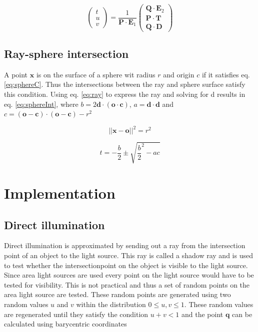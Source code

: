 \documentclass[twocolumn]{article}
\begin{document}
\begin{equation}
\label{eq:triInt}
\begin{pmatrix}
	t \\
  	u \\
  	v 
\end{pmatrix}
= \frac{1}{\mathbf{P} \cdot \mathbf{E}_1}
\begin{pmatrix}
	  	\mathbf{Q} \cdot \mathbf{E}_2 \\
  		\mathbf{P} \cdot \mathbf{T} \\
  		\mathbf{Q} \cdot \mathbf{D}
\end{pmatrix}
\end{equation}

\subsection{Ray-sphere intersection}
A point $\mathbf{x}$ is on the surface of a sphere wit radius $r$ and origin $c$ if it satisfies eq. \ref{eq:sphereC}. Thus the intersections between the ray and sphere surface satisfy this condition. Using eq. \ref{eq:ray} to express the ray and solving for d results in eq. \ref{eq:sphereInt}, where $b = 2\mathbf{d} \cdot (\mathbf{o} \cdot \mathbf{c})$, $a = \mathbf{d} \cdot \mathbf{d}$ and $c = (\mathbf{o} - \mathbf{c}) \cdot (\mathbf{o} - \mathbf{c}) - r^2$

\begin{equation}
	\label{eq:sphereC}
	||\mathbf{x} - \mathbf{o}||^2 = r^2
\end{equation}

\begin{equation}
	\label{eq:sphereInt}
	t = - \frac{b}{2} \pm \sqrt{\frac{b}{2}^2 - ac}
\end{equation}

\section{Implementation}

\subsection{Direct illumination}
Direct illumination is approximated by sending out a ray from the intersection point of an object to the light source. This ray is called a shadow ray and is used to test whether the intersectionpoint on the object is visible to the light source. Since area light sources are used every point on the light source would have to be tested for visibility. This is not practical and thus a set of random points on the area light source are tested. These random points are generated using two random values $u$ and $v$ within the distribution $0 \leq u,v \leq 1$. These random values are regenerated until they satisfy the condition $u + v < 1$ and the point $\mathbf{q}$ can be calculated using barycentric coordinates
\end{document}
